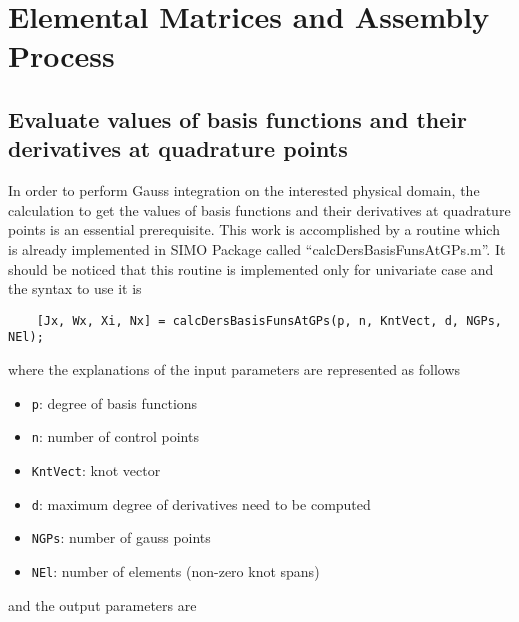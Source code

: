\section{Elemental Matrices and Assembly Process}
\subsection{Evaluate values of basis functions and their derivatives at quadrature points}
In order to perform Gauss integration on the interested physical domain, the calculation to get the values of basis functions and their derivatives at quadrature points is an essential prerequisite. This work is accomplished by a routine which is already implemented in SIMO Package called ``calcDersBasisFunsAtGPs.m''. It should be noticed that this routine is implemented only for univariate case and the syntax to use it is
\begin{lstlisting}
    [Jx, Wx, Xi, Nx] = calcDersBasisFunsAtGPs(p, n, KntVect, d, NGPs, NEl);
\end{lstlisting}
where the explanations of the input parameters are represented as follows
\begin{itemize}
    \item \lstinline{p}: degree of basis functions
    \item \lstinline{n}: number of control points
    \item \lstinline{KntVect}: knot vector
    \item \lstinline{d}: maximum degree of derivatives need to be computed
    \item \lstinline{NGPs}: number of gauss points
    \item \lstinline{NEl}: number of elements (non-zero knot spans)
\end{itemize}
and the output parameters are
